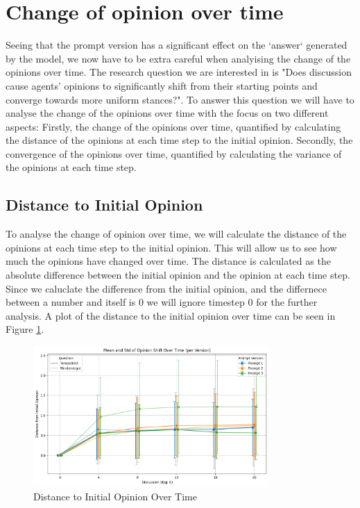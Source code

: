 \documentclass[12pt]{article}
\begin{document}
\section{Change of opinion over time}
Seeing that the prompt version has a significant effect on the `answer` generated by the model, we now have to be extra careful when analyising the change of the opinions over time. The research question we are interested in is "Does discussion cause agents' opinions to significantly shift from their starting points and converge towards more uniform stances?". To answer this question we will have to analyse the change of the opinions over time with the focus on two different aspects: Firstly, the change of the opinions over time, quantified by calculating the distance of the opinions at each time step to the initial opinion. Secondly, the convergence of the opinions over time, quantified by calculating the variance of the opinions at each time step.

\subsection{Distance to Initial Opinion}

To analyse the change of opinion over time, we will calculate the distance of the opinions at each time step to the initial opinion. This will allow us to see how much the opinions have changed over time. The distance is calculated as the absolute difference between the initial opinion and the opinion at each time step. Since we caluclate the difference from the initial opinion, and the differnece between a number and itself is 0 we will ignore timestep 0 for the further analysis. A plot of the distance to the initial opinion over time can be seen in Figure \ref{fig:distance_to_initial_opinion}.

\begin{figure}
\centering
\includegraphics[width=0.8\textwidth]{img/distance_to_initial_opinion.png}
\caption{Distance to Initial Opinion Over Time}
\label{fig:distance_to_initial_opinion}
\end{figure}
\end{document}
